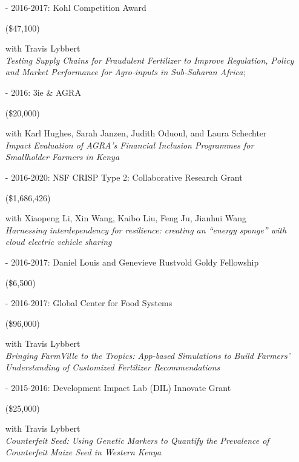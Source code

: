 \documentclass[11pt]{article}
\begin{document}
\begin{itemize}[itemsep=0pt, leftmargin=20pt]

\item [-]2016-2017: Kohl Competition Award
\begin{money}
(\$47,100)
\end{money}
with Travis Lybbert \\
\emph{Testing Supply Chains for Fraudulent Fertilizer to Improve Regulation,
Policy and Market Performance for Agro-inputs in Sub-Saharan Africa};
 
\item [-]2016: 3ie \& AGRA
\begin{money}
(\$20,000)
\end{money}
with Karl Hughes, Sarah Janzen, Judith Oduoul, and Laura Schechter\\
\emph{Impact Evaluation of AGRA\textquoteright s Financial Inclusion Programmes for Smallholder Farmers in Kenya}

\item [-]2016-2020: NSF CRISP Type 2: Collaborative Research Grant
\begin{money}
(\$1,686,426)
\end{money}
with Xiaopeng Li, Xin Wang, Kaibo Liu, Feng Ju, Jianhui Wang \\
\emph{Harnessing interdependency for resilience: creating an ``energy sponge'' with cloud electric vehicle sharing}

\item [-]2016-2017: Daniel Louis and Genevieve Rustvold Goldy Fellowship
\begin{money}
(\$6,500) 
\end{money}

\item [-]2016-2017: Global Center for Food Systems
\begin{money}
(\$96,000)
\end{money}
with Travis Lybbert \\
\emph{Bringing FarmVille to the Tropics: App-based Simulations to Build Farmers' Understanding of Customized Fertilizer Recommendations}

\item [-]2015-2016: Development Impact Lab (DIL) Innovate Grant
\begin{money}
(\$25,000)
\end{money}
with Travis Lybbert \\
\emph{Counterfeit Seed: Using Genetic Markers to Quantify the Prevalence of Counterfeit Maize Seed in Western Kenya}


\end{itemize}
\end{document}
